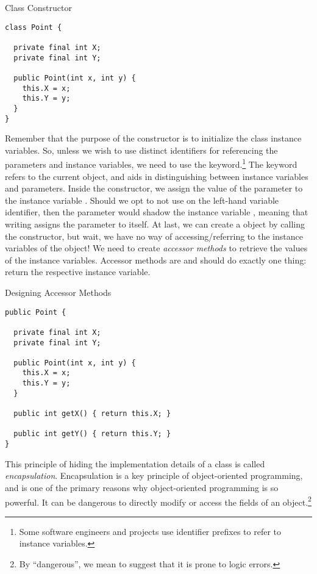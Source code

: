 \begin{cl}[]{ Class Constructor}
\begin{lstlisting}[language=MyJava]
class Point {
  
  private final int X;
  private final int Y;
  
  public Point(int x, int y) {
    this.X = x;
    this.Y = y;
  }
}
\end{lstlisting}
\end{cl}
Remember that the purpose of the constructor is to initialize the class instance variables. So, unless we wish to use distinct identifiers for referencing the parameters and instance variables, we need to use the  keyword.\footnote{Some software engineers and projects use identifier prefixes to refer to instance variables.} The  keyword refers to the current object, and aids in distinguishing between instance variables and parameters. Inside the constructor, we assign the value of the parameter  to the instance variable . Should we opt to not use  on the left-hand variable identifier, then the parameter  would shadow the instance variable , meaning that writing  assigns the parameter to itself. At last, we can create a  object by calling the constructor, but wait, we have no way of accessing/referring to the instance variables of the  object! We need to create \textit{accessor methods} to retrieve the values of the instance variables. Accessor methods are  and should do exactly one thing: return the respective instance variable.

\begin{cl}[]{Designing Accessor Methods}
\begin{lstlisting}[language=MyJava]
public Point {

  private final int X;
  private final int Y;
  
  public Point(int x, int y) {
    this.X = x;
    this.Y = y;
  }
  
  public int getX() { return this.X; }
  
  public int getY() { return this.Y; }
}
\end{lstlisting}
\end{cl}

This principle of hiding the implementation details of a class is called \textit{encapsulation}. Encapsulation is a key principle of object-oriented programming, and is one of the primary reasons why object-oriented programming is so powerful. It can be dangerous to directly modify or access the fields of an object.\footnote{By ``dangerous'', we mean to suggest that it is prone to logic errors.} 

